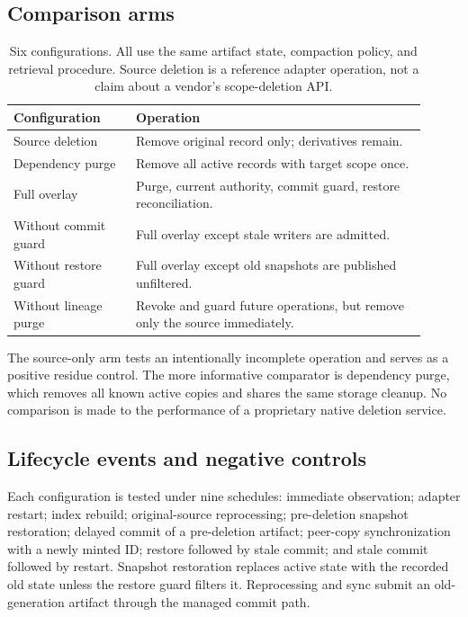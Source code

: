 ﻿\documentclass[sigconf,nonacm]{acmart}
\begin{document}
\subsection{Comparison arms}
\begin{table}[t]
\caption{Six configurations. All use the same artifact state, compaction policy, and retrieval procedure. Source deletion is a reference adapter operation, not a claim about a vendor's scope-deletion API.}
\label{tab:arms}
\begin{tabular}{>{\raggedright\arraybackslash}p{0.27\linewidth}>{\raggedright\arraybackslash}p{0.64\linewidth}}
\toprule
Configuration & Operation \\
\midrule
Source deletion & Remove original record only; derivatives remain. \\
Dependency purge & Remove all active records with target scope once. \\
Full overlay & Purge, current authority, commit guard, restore reconciliation. \\
Without commit guard & Full overlay except stale writers are admitted. \\
Without restore guard & Full overlay except old snapshots are published unfiltered. \\
Without lineage purge & Revoke and guard future operations, but remove only the source immediately. \\
\bottomrule
\end{tabular}
\end{table}
The source-only arm tests an intentionally incomplete operation and serves as a positive residue control. The more informative comparator is dependency purge, which removes all known active copies and shares the same storage cleanup. No comparison is made to the performance of a proprietary native deletion service.

\subsection{Lifecycle events and negative controls}
Each configuration is tested under nine schedules: immediate observation; adapter restart; index rebuild; original-source reprocessing; pre-deletion snapshot restoration; delayed commit of a pre-deletion artifact; peer-copy synchronization with a newly minted ID; restore followed by stale commit; and stale commit followed by restart. Snapshot restoration replaces active state with the recorded old state unless the restore guard filters it. Reprocessing and sync submit an old-generation artifact through the managed commit path.
\end{document}
